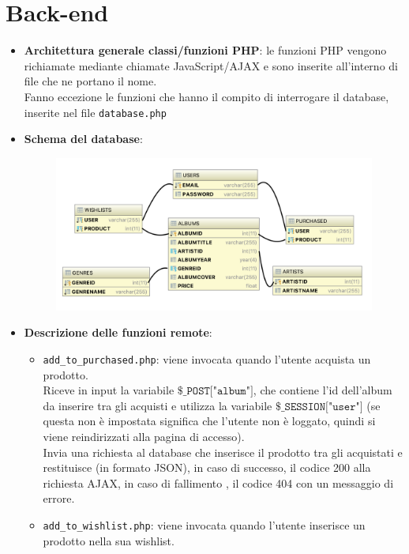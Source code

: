 \section{Back-end}
\begin{itemize}
    \item \textbf{Architettura generale classi/funzioni PHP}: le funzioni PHP vengono richiamate mediante chiamate JavaScript/AJAX e sono inserite all'interno di file che ne portano il nome.\\
    Fanno eccezione le funzioni che hanno il compito di interrogare il database, inserite nel file \texttt{database.php}
    \item \textbf{Schema del database}: 
    	\begin{figure}[h!]
    		\centering
    		\includegraphics[scale=0.55]{schema-db.png}
    	\end{figure}
    \item \textbf{Descrizione delle funzioni remote}:
        \begin{itemize}
            \item \texttt{add\_to\_purchased.php}: viene invocata quando l'utente acquista un prodotto.\\
            Riceve in input la variabile $\texttt{\$\_POST["album"]}$, che contiene l'id dell'album da inserire tra gli acquisti e utilizza la variabile $\texttt{\$\_SESSION["user"]}$ (se questa non è impostata significa che l'utente non è loggato, quindi si viene reindirizzati alla pagina di accesso).\\
            Invia una richiesta al database che inserisce il prodotto tra gli acquistati e restituisce (in formato JSON), in caso di successo, il codice 200 alla richiesta AJAX, in caso di fallimento , il codice 404 con un messaggio di errore.
            \item \texttt{add\_to\_wishlist.php}: viene invocata quando l'utente inserisce un prodotto nella sua wishlist.\\

\end{itemize}
\end{itemize}
